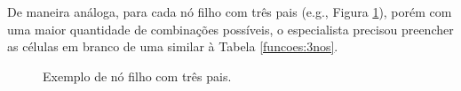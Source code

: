 De maneira análoga, para cada nó filho com três pais (e.g., Figura \ref{funcoes:bn2}), porém com uma maior quantidade de combinações possíveis, o especialista precisou preencher as células em branco de uma similar à Tabela \ref{funcoes:3nos}.

\begin{figure}[ht!]
\begin{center}
	\end{center}
	\caption{Exemplo de nó filho com três pais.}
	\label{funcoes:bn2}
\end{figure}

